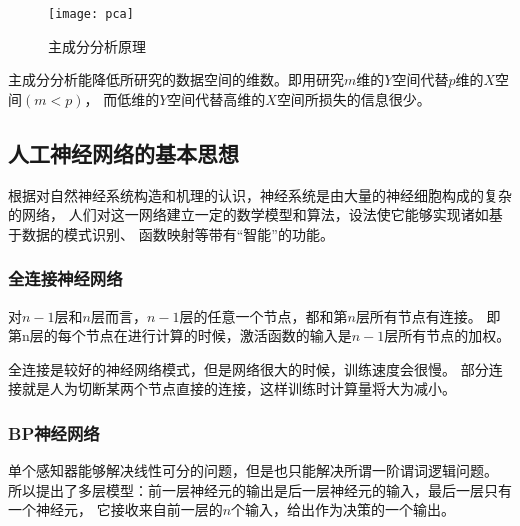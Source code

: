 \begin{figure}[ht]
	\centering
	\texttt{[image: pca]}
	\caption{主成分分析原理}
	\label{fig:pca}
\end{figure}

主成分分析能降低所研究的数据空间的维数。即用研究$m$维的$Y$空间代替$p$维的$X$空间$(m<p)$，
而低维的$Y$空间代替高维的$X$空间所损失的信息很少。

\subsection{人工神经网络的基本思想}

根据对自然神经系统构造和机理的认识，神经系统是由大量的神经细胞构成的复杂的网络，
人们对这一网络建立一定的数学模型和算法，设法使它能够实现诸如基于数据的模式识别、
函数映射等带有“智能”的功能。

\subsubsection{全连接神经网络}

对$n-1$层和$n$层而言，$n-1$层的任意一个节点，都和第$n$层所有节点有连接。
即第n层的每个节点在进行计算的时候，激活函数的输入是$n-1$层所有节点的加权。

全连接是较好的神经网络模式，但是网络很大的时候，训练速度会很慢。
部分连接就是人为切断某两个节点直接的连接，这样训练时计算量将大为减小。

\subsubsection{BP神经网络}

单个感知器能够解决线性可分的问题，但是也只能解决所谓一阶谓词逻辑问题。
所以提出了多层模型：前一层神经元的输出是后一层神经元的输入，最后一层只有一个神经元，
它接收来自前一层的$n$个输入，给出作为决策的一个输出。
